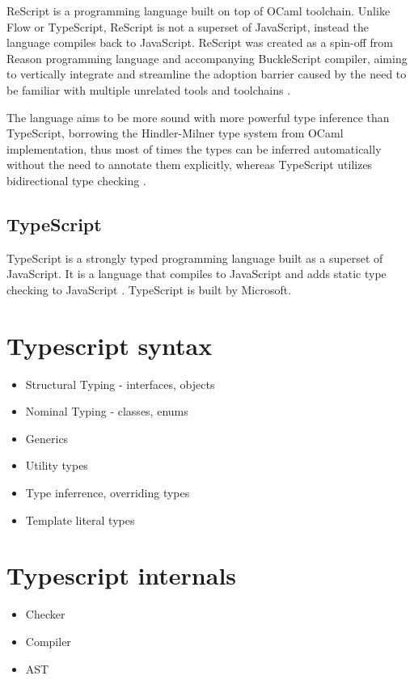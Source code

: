 ReScript is a programming language built on top of OCaml toolchain. Unlike Flow or TypeScript, ReScript is not a superset of JavaScript, instead the language compiles back to JavaScript. ReScript was created as a spin-off from Reason programming language and accompanying BuckleScript compiler, aiming to vertically integrate and streamline the adoption barrier caused by the need to be familiar with multiple unrelated tools and toolchains \cite{BuckleScriptReasonRebranding}.

The language aims to be more sound with more powerful type inference than TypeScript, borrowing the Hindler-Milner type system from OCaml implementation, thus most of times the types can be inferred automatically without the need to annotate them explicitly, whereas TypeScript utilizes bidirectional type checking \cite{ReconstructingTypeScriptPart}.

\subsection{TypeScript}

TypeScript is a strongly typed programming language built as a superset of JavaScript. It is a language that compiles to JavaScript and adds static type checking to JavaScript \cite{DocumentationTypeScriptJavaScript}. TypeScript is built by Microsoft.

\section{Typescript syntax}

\begin{itemize}
  \item Structural Typing - interfaces, objects
  \item Nominal Typing - classes, enums
  \item Generics
  \item Utility types
  \item Type inferrence, overriding types
  \item Template literal types
\end{itemize}

\section{Typescript internals}

\begin{itemize}
  \item Checker
  \item Compiler
  \item AST
\end{itemize}

